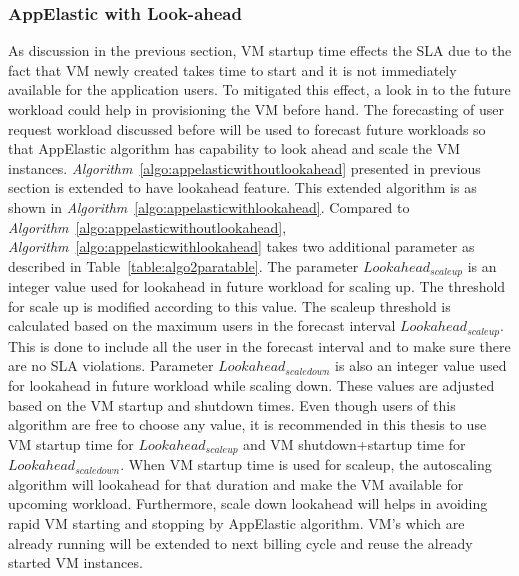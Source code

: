 \subsubsection{AppElastic with Look-ahead}
\label{subs:AppElastic with Look-ahead}
As discussion in the previous section, VM startup time effects the SLA due to the fact that VM newly created takes time to start and  it is not immediately available for the application users. To mitigated this effect, a look in to the future workload could help in provisioning the VM before hand. The forecasting of user request workload discussed before will be used to forecast future workloads so that AppElastic algorithm has capability to look ahead and scale the VM instances. \textit{Algorithm}~\ref{algo:appelasticwithoutlookahead} presented in previous section is extended to have lookahead feature. This extended algorithm is as shown in  \textit{Algorithm}~\ref{algo:appelasticwithlookahead}. Compared to  \textit{Algorithm}~\ref{algo:appelasticwithoutlookahead}, \textit{Algorithm}~\ref{algo:appelasticwithlookahead} takes two additional parameter as described in Table~\ref{table:algo2paratable}. The parameter \( Lookahead_{scaleup} \) is an integer value used for lookahead in future workload for scaling  up. The threshold for scale up is modified according to this value. The scaleup threshold is calculated based on the maximum users in the forecast interval \( Lookahead_{scaleup} \). This is done to include all the user in the forecast interval and to make sure there are no SLA violations. Parameter \( Lookahead_{scaledown} \) is also an integer value used for lookahead in future workload while scaling down. These values are adjusted based on the VM startup and shutdown times. Even though users of this algorithm are free to choose any value, it is recommended in this thesis to use VM startup time for \( Lookahead_{scaleup} \) and VM shutdown+startup time for \( Lookahead_{scaledown} \). When VM startup time is used for scaleup, the autoscaling algorithm will lookahead for that duration and make the VM available for upcoming workload. Furthermore, scale down lookahead will helps in avoiding rapid VM starting and stopping by AppElastic algorithm. VM's which are already running will be extended to next billing cycle and reuse the already started VM instances.


\begin{flushleft}
  \begin{table}
    \caption{List of input parameters to AppElastic algorithm with lookahead}
     \label{table:algo2paratable}
\end{table}
\end{flushleft}

